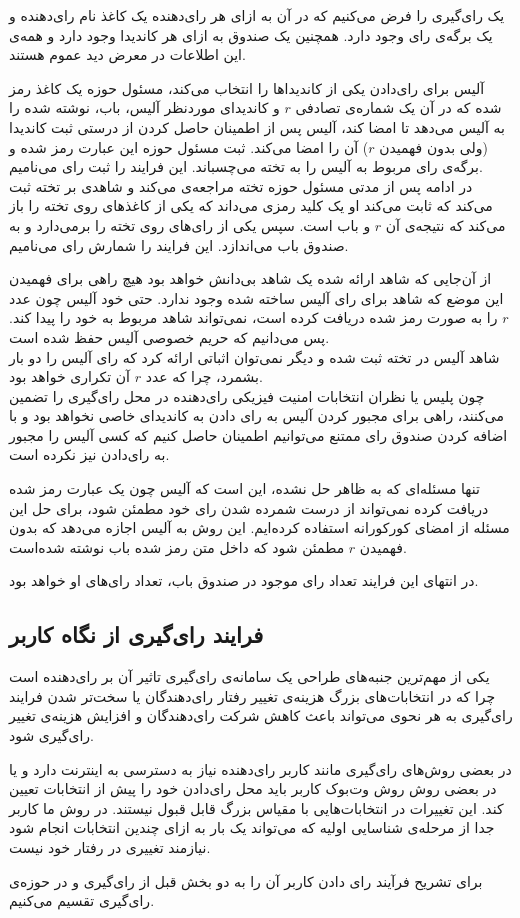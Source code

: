 \par
یک رای‌گیری را فرض می‌کنیم که در آن به ازای هر رای‌دهنده یک کاغذ نام رای‌دهنده و یک برگه‌ی رای وجود دارد. همچنین یک صندوق به ازای هر کاندیدا وجود دارد و همه‌ی این اطلاعات در معرض دید عموم هستند. 
\par
آلیس برای رای‌دادن یکی از کاندیداها را انتخاب می‌کند، مسئول حوزه یک کاغذ رمز شده که در آن یک شماره‌ی تصادفی $r$ و کاندیدای موردنظر آلیس، باب، نوشته شده را به آلیس می‌دهد تا امضا کند، آلیس پس از اطمینان حاصل کردن از درستی ثبت کاندیدا (ولی بدون فهمیدن $r$) آن را امضا می‌کند. ثبت مسئول حوزه این عبارت رمز شده و برگه‌ی رای مربوط به آلیس را به تخته می‌چسباند. این فرایند را ثبت رای‌ می‌نامیم.
\\
در ادامه پس از مدتی مسئول حوزه تخته مراجعه‌ی می‌کند و شاهدی بر تخته ثبت می‌کند که ثابت می‌کند او یک کلید رمزی می‌داند که یکی از کاغذ‌های روی تخته را باز می‌کند که نتیجه‌ی آن $r$ و باب است. سپس یکی از رای‌های روی تخته را برمی‌دارد و به صندوق باب می‌اندازد. این فرایند را شمارش رای‌ می‌نامیم.
\par
از آن‌جایی که شاهد ارائه شده یک شاهد بی‌دانش خواهد بود هیچ راهی برای فهمیدن این موضع که شاهد برای رای آلیس ساخته شده وجود ندارد. حتی خود آلیس چون عدد $r$ را به صورت رمز شده دریافت کرده است، نمی‌تواند شاهد مربوط به خود را پیدا کند. پس می‌دانیم که حریم خصوصی آلیس حفظ شده است. 
\\
 شاهد آلیس در تخته ثبت شده و دیگر نمی‌توان اثباتی ارائه کرد که رای آلیس را دو بار بشمرد، چرا که عدد $r$ آن تکراری خواهد بود.
\\
چون پلیس یا نظران انتخابات امنیت فیزیکی رای‌دهنده در محل رای‌گیری را تضمین می‌کنند، راهی برای مجبور کردن آلیس به رای دادن به کاندیدای خاصی نخواهد بود و با اضافه کردن صندوق رای ممتنع می‌توانیم اطمینان حاصل کنیم که کسی آلیس را مجبور به رای‌دادن نیز نکرده است. 
\par 
تنها مسئله‌ای که به ظاهر حل نشده، این است که آلیس چون یک عبارت رمز شده دریافت کرده نمی‌تواند از درست شمرده شدن رای خود مطمئن شود، برای حل این مسئله از امضای کورکورانه استفاده کرده‌ایم. این روش به آلیس اجازه می‌دهد که بدون فهمیدن $r$ مطمئن شود که داخل متن رمز شده باب نوشته شده‌است. 
\par 
در انتهای این فرایند تعداد رای‌ موجود در صندوق باب، تعداد رای‌های او خواهد بود.


\subsection{فرایند رای‌گیری از نگاه کاربر}
یکی از مهم‌ترین جنبه‌های طراحی یک سامانه‌ی رای‌گیری تاثیر آن بر رای‌دهنده است چرا که در انتخابات‌های بزرگ هزینه‌ی تغییر رفتار رای‌دهندگان یا سخت‌تر شدن فرایند رای‌گیری به هر نحوی می‌تواند باعث کاهش شرکت رای‌دهندگان و افزایش هزینه‌ی تغییر رای‌گیری شود.
\par
در بعضی روش‌های رای‌گیری مانند  کاربر رای‌دهنده نیاز به دسترسی به اینترنت دارد و یا در بعضی روش‌ روش وت‌بوک کاربر باید محل رای‌دادن خود را پیش از انتخابات تعیین کند. این تغییرات در انتخابات‌هایی با مقیاس بزرگ قابل قبول نیستند. در روش ما کاربر جدا از مرحله‌ی شناسایی اولیه که می‌تواند یک بار به ازای چندین انتخابات انجام شود نیازمند تغییری در رفتار خود نیست. 
\par
برای تشریح فرآیند رای‌ دادن کاربر آن را به دو بخش قبل از رای‌گیری و در حوزه‌ی رای‌گیری تقسیم می‌کنیم. 

